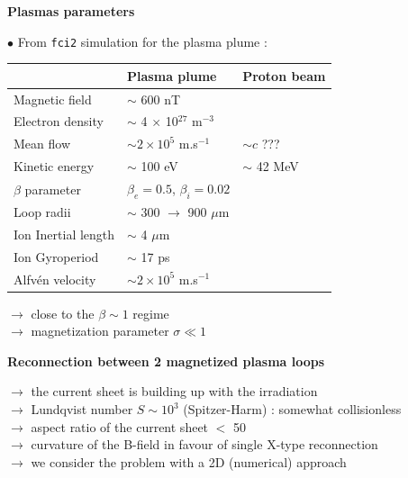 \documentclass[landscape]{slides}
\begin{document}
\begin{slide}
{\large \textbf{Plasmas parameters}}

$\bullet$ From \texttt{fci2} simulation for the plasma plume :

\begin{center}
\begin{tabular}{lll}
\hline
\hline
& Plasma plume & Proton beam \hspace{2.0cm}\\
\hline
Magnetic field             & $\sim$ 600 nT                              & \\
Electron density           & $\sim$ 4 $\times$ 10$^{27}$ m$^{-3}$       & \\
Mean flow                  & $\sim 2 \times 10^5$ m.s$^{-1}$            & $\sim c$ ??? \\
Kinetic energy             & $\sim$ 100 eV                              & $\sim$ 42 MeV \\
$\beta$ parameter          & $\beta_e = 0.5$, $\beta_i = 0.02$          & \\
Loop radii                 & $\sim$ 300 $\to$ 900 $\mu$m                & \\
Ion Inertial length        & $\sim$ 4 $\mu$m                            & \\
Ion Gyroperiod             & $\sim$ 17 ps                               & \\
Alfvén velocity            & $\sim 2 \times 10^5$ m.s$^{-1}$            & \\
\hline
\hline
\end{tabular}
\end{center}

$\to$ close to the $\beta \sim 1$ regime \\
$\to$ magnetization parameter $\sigma \ll 1$ \\

\end{slide}



\begin{slide}
{\large \textbf{Reconnection between 2 magnetized plasma loops}}

\begin{center}

\end{center}

$\to$ the current sheet is building up with the irradiation \\
$\to$ Lundqvist number $S \sim 10^3$ (Spitzer-Harm) : somewhat collisionless \\
$\to$ aspect ratio of the current sheet $<$ 50 \\
$\to$ curvature of the B-field in favour of single X-type reconnection \\
$\to$ we consider the problem with a 2D (numerical) approach \\

\end{slide}
\end{document}
